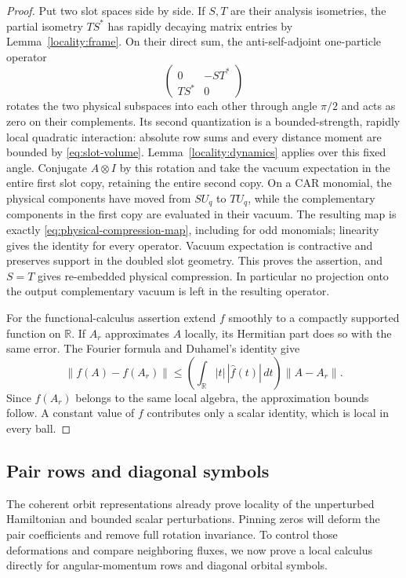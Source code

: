 \begin{proof}
Put two slot spaces side by side.  If $S,T$ are their analysis
isometries, the partial isometry $TS^*$ has rapidly decaying matrix
entries by Lemma~\ref{locality:frame}.  On their direct sum, the
anti-self-adjoint one-particle operator
\[
 \begin{pmatrix}0&-ST^*\\TS^*&0\end{pmatrix}
\]
rotates the two physical subspaces into each other through angle
$\pi/2$ and acts as zero on their complements.  Its second
quantization is a bounded-strength, rapidly local quadratic
interaction: absolute row sums and every distance moment are bounded
by \eqref{eq:slot-volume}.  Lemma~\ref{locality:dynamics} applies
over this fixed angle.  Conjugate $A\otimes I$ by this rotation and
take the vacuum expectation in the entire first slot copy, retaining
the entire second copy.  On a CAR monomial, the physical components
have moved from $S U_q$ to $T U_q$, while the complementary components
in the first copy are evaluated in their vacuum.  The resulting map
is exactly \eqref{eq:physical-compression-map}, including for odd
monomials; linearity gives the identity for every operator.  Vacuum
expectation is contractive and preserves support in the doubled slot
geometry.  This proves the assertion, and $S=T$ gives re-embedded
physical compression.  In particular no projection onto the output
complementary vacuum is left in the resulting operator.

For the functional-calculus assertion extend $f$ smoothly to a compactly
supported function on $\mathbb R$.  If $A_r$ approximates $A$ locally,
its Hermitian part does so with the same error.  The Fourier formula
and Duhamel's identity give
\[
 \|f(A)-f(A_r)\|
 \leq\left(\int_{\mathbb R}|t|\,|\widehat f(t)|\,dt\right)
       \|A-A_r\|.
\]
Since $f(A_r)$ belongs to the same local algebra, the approximation
bounds follow.  A constant value of $f$ contributes only a scalar
identity, which is local in every ball.
\end{proof}

\subsection{Pair rows and diagonal symbols}

The coherent orbit representations already prove locality of the
unperturbed Hamiltonian and bounded scalar perturbations.  Pinning zeros
will deform the pair coefficients and remove full rotation invariance.
To control those deformations and compare neighboring fluxes, we now
prove a local calculus directly for angular-momentum rows and diagonal
orbital symbols.

